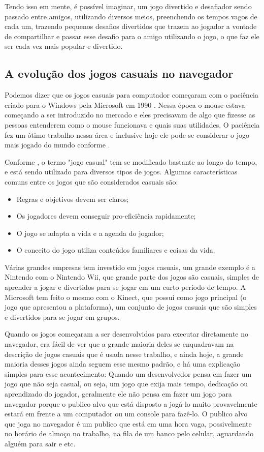 Tendo isso em mente, é possível imaginar, um jogo divertido e desafiador
sendo passado entre amigos, utilizando diversos meios, preenchendo os
tempos vagos de cada um, trazendo pequenos desafios divertidos que
trazem ao jogador a vontade de compartilhar e passar esse desafio para
o amigo utilizando o jogo, o que faz ele ser cada vez mais popular e
divertido.

\subsection{A evolução dos jogos casuais no navegador}

Podemos dizer que os jogos casuais para computador começaram com
o paciência criado para o Windows pela Microsoft em 1990 \cite{trefry2010casual}.
Nessa época o mouse estava começando a ser introduzido no mercado e
eles precisavam de algo que fizesse as pessoas entenderem como o mouse
funcionava e quais suas utilidades. O paciência fez um ótimo trabalho
nessa área e inclusive hoje ele pode se considerar o jogo mais jogado
do mundo conforme .

Conforme , o termo "jogo casual" tem se
modificado bastante ao longo do tempo, e está sendo utilizado para
diversos tipos de jogos. Algumas características comuns entre os jogos
que são considerados casuais são:

\begin{itemize}
    \item Regras e objetivos devem ser claros;
    \item Os jogadores devem conseguir pro-eficiência rapidamente;
    \item O jogo se adapta a vida e a agenda do jogador;
    \item O conceito do jogo utiliza conteúdos familiares e coisas da vida.
\end{itemize}

Várias grandes empresas tem investido em jogos casuais, um grande
exemplo é a Nintendo com o Nintendo Wii, que grande parte dos jogos
são casuais, simples de aprender a jogar e divertidos para se jogar
em um curto período de tempo.
A Microsoft tem feito o mesmo com o Kinect, que
possui como jogo principal (o jogo que apresentou a plataforma), um
conjunto de jogos casuais que são simples e divertidos para se jogar
em grupos.

Quando os jogos começaram a ser desenvolvidos para executar
diretamente no navegador, era fácil de ver que a grande maioria deles
se enquadravam na descrição de jogos casuais que é usada nesse
trabalho, e ainda hoje, a grande maioria desses jogos ainda seguem
esse mesmo padrão, e há uma explicação simples para esse
acontecimento: Quando um desenvolvedor pensa em fazer um jogo que
não seja casual, ou seja, um jogo que exija mais tempo, dedicação ou
aprendizado do jogador, geralmente ele não pensa em fazer um jogo para
navegador porque o publico alvo que está disposto a jogá-lo muito
provavelmente estará em frente a um computador ou um console para
fazê-lo.
O publico alvo que joga no navegador é um publico que está em uma hora
vaga, possivelmente no horário de almoço no trabalho, na fila de um
banco pelo celular, aguardando alguém para sair e etc.

